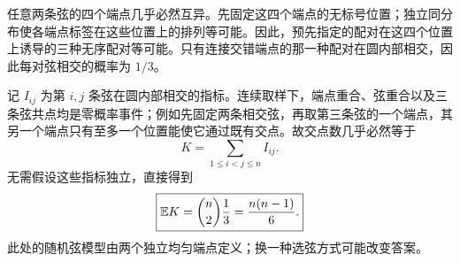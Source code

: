 任意两条弦的四个端点几乎必然互异。先固定这四个端点的无标号位置；独立同分布使各端点标签在这些位置上的排列等可能。因此，预先指定的配对在这四个位置上诱导的三种无序配对等可能。只有连接交错端点的那一种配对在圆内部相交，因此每对弦相交的概率为 $1/3$。

记 $I_{ij}$ 为第 $i,j$ 条弦在圆内部相交的指标。连续取样下，端点重合、弦重合以及三条弦共点均是零概率事件；例如先固定两条相交弦，再取第三条弦的一个端点，其另一个端点只有至多一个位置能使它通过既有交点。故交点数几乎必然等于
\[
K=\sum_{1\le i<j\le n}I_{ij}.
\]
无需假设这些指标独立，直接得到
\[
\boxed{\mathbb{E} K=\binom n2\frac13=\frac{n(n-1)}6.}
\]
此处的随机弦模型由两个独立均匀端点定义；换一种选弦方式可能改变答案。
